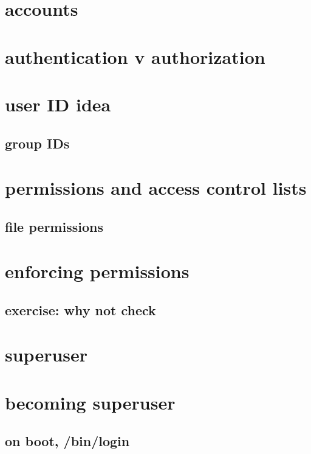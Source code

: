 \section{accounts}


\section{authentication v authorization}


\section{user ID idea}


\subsection{group IDs}


\section{permissions and access control lists}
\subsection{file permissions}



\section{enforcing permissions}


\subsection{exercise: why not check}


\section{superuser}


\section{becoming superuser}

\subsection{on boot, /bin/login}


